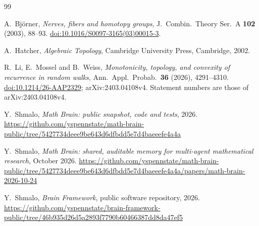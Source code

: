 \documentclass[11pt]{article}
\theoremstyle{remark}
\providecommand{\doi}[1]{\href{https://doi.org/#1}{doi:#1}}
\begin{document}
\begin{thebibliography}{99}

A.~Bj\"orner, \emph{Nerves, fibers and homotopy groups}, J.\ Combin.\ Theory Ser.~A \textbf{102} (2003), 88--93.
\doi{10.1016/S0097-3165(03)00015-3}.

A.~Hatcher, \emph{Algebraic Topology}, Cambridge University Press, Cambridge, 2002.

R.~Li, E.~Mossel and B.~Weiss, \emph{Monotonicity, topology, and convexity of recurrence in random walks}, Ann.\ Appl.\
Probab.\ \textbf{36} (2026), 4291--4310. \doi{10.1214/26-AAP2329}; arXiv:2403.04108v4. Statement numbers
are those of arXiv:2403.04108v4.

Y.~Shmalo, \emph{Math Brain: public snapshot, code and tests}, 2026.
\url{https://github.com/yspennstate/math-brain-public/tree/5427734deee9be643d6dfbdd5e7d4baeeefe4a4a}

Y.~Shmalo, \emph{Math Brain: shared, auditable memory for multi-agent mathematical research}, October 2026.
\url{https://github.com/yspennstate/math-brain-public/tree/5427734deee9be643d6dfbdd5e7d4baeeefe4a4a/papers/math-brain-2026-10-24}

Y.~Shmalo, \emph{Brain Framework}, public software repository, 2026.
\url{https://github.com/yspennstate/brain-framework-public/tree/46b935d26d5a2893f7790b60466387dd8da47ef5}

\end{thebibliography}
\end{document}
